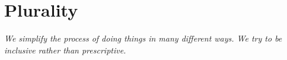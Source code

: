 \section{Plurality}
\textit{We simplify the process of doing things in many different ways. We try to be inclusive rather than prescriptive.}
